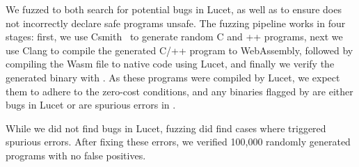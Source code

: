 %
We fuzzed \verifname{} to both search for potential bugs in Lucet, as well as
to ensure \verifname{} does not incorrectly declare safe programs unsafe.
%
The fuzzing pipeline works in four stages: first, we use Csmith~\cite{csmith} to
generate random C and \C++ programs, next we use Clang to compile the generated
C/\C++ program to WebAssembly, followed by compiling the Wasm file to native code
using Lucet, and finally we verify the generated binary with \verifname{}.
%
As these programs were compiled by Lucet, we expect them to adhere to the
zero-cost conditions, and any binaries flagged by \verifname{} are either bugs
in Lucet or are spurious errors in \verifname{}.

While we did not find bugs in Lucet, fuzzing did find cases where
\verifname{} triggered spurious errors.
%
After fixing these errors, we verified 100,000 randomly generated programs
with no false positives.

